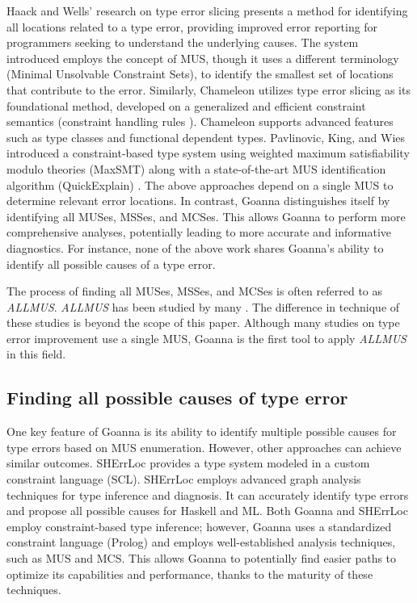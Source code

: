 \documentclass[pdflatex,lineno,sn-nature,Numbered]{sn-jnl}%
\begin{document}
Haack and Wells' research on type error slicing \cite{Haack2004-fr} presents a method for identifying all locations related to a type error, providing improved error reporting for programmers seeking to understand the underlying causes. The system introduced employs the concept of MUS, though it uses a different terminology (Minimal Unsolvable Constraint Sets), to identify the smallest set of locations that contribute to the error. Similarly, Chameleon \cite{Stuckey2003-pz} utilizes type error slicing as its foundational method, developed on a generalized and efficient constraint semantics (constraint handling rules \cite{Fruehwirth2017-ro}). Chameleon supports advanced features such as type classes and functional dependent types. Pavlinovic, King, and Wies introduced a constraint-based type system using weighted maximum satisfiability modulo theories (MaxSMT) along with a state-of-the-art MUS identification algorithm (QuickExplain) \cite{Junker2004-ds}. The above approaches depend on a single MUS to determine relevant error locations. In contrast, Goanna distinguishes itself by identifying all MUSes, MSSes, and MCSes. This allows Goanna to perform more comprehensive analyses, potentially leading to more accurate and informative diagnostics. For instance, none of the above work shares Goanna's ability to identify all possible causes of a type error. 

The process of finding all MUSes, MSSes, and MCSes is often referred to as \textit{ALLMUS}. {\it ALLMUS} has been studied by many \cite{de-la-Banda2003-jm,Bailey2005-hi,Liffiton2008-mx,Liffiton2016-xi,Zhao2016-bu,Bendik2020-pz}. The difference in technique of these studies is beyond the scope of this paper. Although many studies on type error improvement use a single MUS, Goanna is the first tool to apply \textit{ALLMUS} in this field.


\subsection{Finding all possible causes of type error}
One key feature of Goanna is its ability to identify multiple possible causes for type errors based on MUS enumeration. However, other approaches can achieve similar outcomes. SHErrLoc \cite{Zhang2015-xy} provides a type system modeled in a custom constraint language (SCL). SHErrLoc employs advanced graph analysis techniques for type inference and diagnosis. It can accurately identify type errors and propose all possible causes for Haskell and ML. Both Goanna and SHErrLoc employ constraint-based type inference; however, Goanna uses a standardized constraint language (Prolog) and employs well-established analysis techniques, such as MUS and MCS. This allows Goanna to potentially find easier paths to optimize its capabilities and performance, thanks to the maturity of these techniques.
\end{document}
